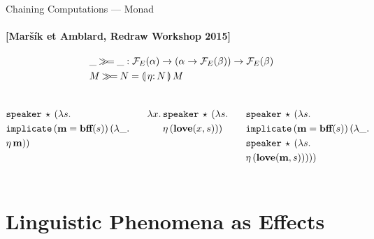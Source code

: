 \documentclass{beamer}
\begin{document}
\begin{frame}{Chaining Computations --- Monad}
  \framesubtitle{[Maršík et Amblard, Redraw Workshop 2015]}
  \nocite{marsik2015pragmatic}

  \begin{align*}
  &\_ \hsbind \_ : \FF_E(\alpha) \to (\alpha \to \FF_E(\beta)) \to \FF_E(\beta) \\
  &M \hsbind N = \ap{\banana{\onto{\eta}{N}}}{M}
  \end{align*}

  \vfill

  \begin{columns}
    \pause
    \vspace*{-3mm}
    \begin{align*}
          &\mathtt{speaker}\,\star\,(\lambda s.\,  \\
          &\mathtt{implicate}\,(\textbf{m} = \textbf{bff}(s))\,(\lambda \_.\,  \\
          &\eta\,\textbf{m}))
    \end{align*}

    \pause
    \vspace*{-3mm}
    \begin{align*}
      \lambda x.\, &\mathtt{speaker}\,\star\,(\lambda s.\,  \\
              &\eta\,(\textbf{love}(x, s)))
    \end{align*}


    \pause
    \vspace*{-3mm}
    \begin{align*}
      &\mathtt{speaker}\,\star\,(\lambda s.\,  \\
      &\mathtt{implicate}\,(\textbf{m} = \textbf{bff}(s))\,(\lambda \_.\,  \\
      &\mathtt{speaker}\,\star\,(\lambda s.\,  \\
      &\eta\,(\textbf{love}(\textbf{m}, s)))))
    \end{align*}
  \end{columns}
\end{frame}



\section{Linguistic Phenomena as Effects}
\end{document}
